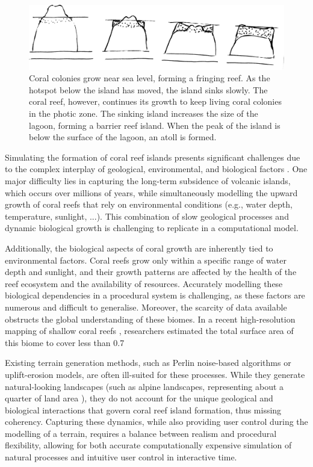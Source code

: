 \begin{figure}[H]
    \includegraphics[width = \linewidth]{other_images/Drawings/Darwin_corals.jpg}
    \caption{Coral colonies grow near sea level, forming a fringing reef. As the hotspot below the island has moved, the island sinks slowly. The coral reef, however, continues its growth to keep living coral colonies in the photic zone. The sinking island increases the size of the lagoon, forming a barrier reef island. When the peak of the island is below the surface of the lagoon, an atoll is formed.}
    \label{fig:coral-island-reef-growth}
\end{figure}

Simulating the formation of coral reef islands presents significant challenges due to the complex interplay of geological, environmental, and biological factors \cite{Hopley2014}. One major difficulty lies in capturing the long-term subsidence of volcanic islands, which occurs over millions of years, while simultaneously modelling the upward growth of coral reefs that rely on environmental conditions (e.g., water depth, temperature, sunlight, ...). This combination of slow geological processes and dynamic biological growth is challenging to replicate in a computational model.

Additionally, the biological aspects of coral growth are inherently tied to environmental factors. Coral reefs grow only within a specific range of water depth and sunlight, and their growth patterns are affected by the health of the reef ecosystem and the availability of resources. Accurately modelling these biological dependencies in a procedural system is challenging, as these factors are numerous and difficult to generalise. Moreover, the scarcity of data available obstructs the global understanding of these biomes. In a recent high-resolution mapping of shallow coral reefs \cite{Lyons2024}, researchers estimated the total surface area of this biome to cover less than 0.7%

Existing terrain generation methods, such as Perlin noise-based algorithms or uplift-erosion models, are often ill-suited for these processes. While they generate natural-looking landscapes (such as alpine landscapes, representing about a quarter of land area \cite{Korner2014}), they do not account for the unique geological and biological interactions that govern coral reef island formation, thus missing coherency. Capturing these dynamics, while also providing user control during the modelling of a terrain, requires a balance between realism and procedural flexibility, allowing for both accurate computationally expensive simulation of natural processes and intuitive user control in interactive time.

